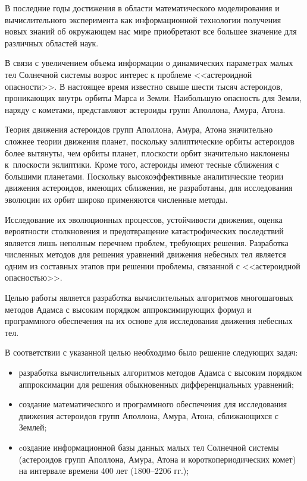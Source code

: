 \smallskip

{
\small

В последние годы достижения в области математического моделирования
и вычислительного эксперимента как информационной технологии получения 
новых знаний об окружающем нас мире приобретают все большее значение для различных областей наук.

В связи с увеличением объема информации о динамических параметрах
малых тел Солнечной системы возрос интерес к проблеме <<астероидной опасности>>. 
В настоящее время известно свыше шести тысяч астероидов, проникающих внутрь орбиты Марса и Земли. Наибольшую опасность для Земли,
наряду с кометами, представляют астероиды групп Аполлона, Амура, Атона.

Теория движения астероидов групп Аполлона, Амура, Атона значительно
сложнее теории движения планет, поскольку эллиптические орбиты астероидов 
более вытянуты, чем орбиты планет, плоскости орбит значительно наклонены 
к~плоскости эклиптики. Кроме того, астероиды имеют тесные сближения с большими планетами. 
Поскольку высокоэффективные аналитические
теории движения астероидов, имеющих сближения, не разработаны, для исследования эволюции их орбит широко применяются численные методы.

Исследование их эволюционных процессов, устойчивости движения, оценка вероятности столкновения и предотвращение катастрофических 
последствий является лишь неполным перечнем проблем, требующих решения. 
Разработка численных методов для решения уравнений движения небесных тел
является одним из составных этапов при решении проблемы, связанной с
<<астероидной опасностью>>.

Целью работы является разработка вычислительных алгоритмов многошаговых методов Адамса
с высоким порядком аппроксимирующих формул и программного обеспечения на их основе для исследования движения небесных тел.

В соответствии с указанной целью необходимо было решение следующих задач:
\begin{itemize}
\item[--] разработка вычислительных алгоритмов методов Адамса с высоким
      порядком аппроксимации для решения обыкновенных дифференциальных уравнений;
      
\item[--] создание математического и программного обеспечения для исследования движения 
астероидов групп Аполлона, Амура, Атона, сближающихся с Землей;

\item[--] cоздание информационной базы данных малых тел Солнечной системы
   (астероидов групп Аполлона, Амура, Атона и короткопериодических
   комет) на интервале времени 400 лет (1800--2206 гг.);
   

\end{itemize}}
